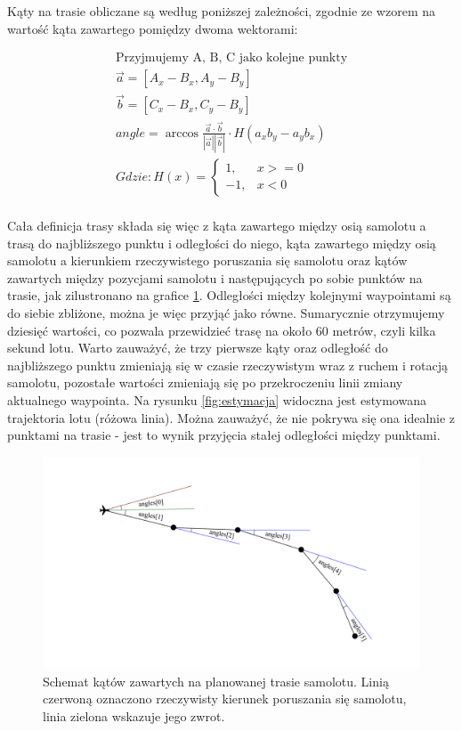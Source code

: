 \documentclass[12pt, a4paper]{article}
\begin{document}
Kąty na trasie obliczane są według poniższej zależności, zgodnie ze wzorem na wartość kąta zawartego pomiędzy dwoma wektorami:

\begin{gather*} 
	\text{Przyjmujemy A, B, C jako kolejne punkty} \\ 
 	\vec{a} = [A_x - B_x, A_y - B_y] \\
 	\vec{b} = [C_x - B_x, C_y - B_y] \\
 	angle = 	\arccos{\frac{\vec{a} \cdot \vec{b}}{|\vec{a}||\vec{b}|} } \cdot H(a_x b_y -  a_y b_x) \\ 
 	Gdzie:
 	H(x) = \begin{cases} 1, & x >= 0 \\ -1, & x < 0 \end{cases}\\
\end{gather*}

Cała definicja trasy składa się więc z kąta zawartego między osią samolotu a trasą do najbliższego punktu i odległości do niego, kąta zawartego między osią samolotu a kierunkiem rzeczywistego poruszania się samolotu oraz kątów zawartych między pozycjami samolotu i następujących po sobie punktów na trasie, jak zilustronano na grafice \ref{fig:katy}. Odległości między kolejnymi waypointami są do siebie zbliżone, można je więc przyjąć jako równe. Sumarycznie otrzymujemy dziesięć wartości, co pozwala przewidzieć trasę na około 60 metrów, czyli kilka sekund lotu. Warto zauważyć, że trzy pierwsze kąty oraz odległość do najbliższego punktu zmieniają się w czasie rzeczywistym wraz z ruchem i rotacją samolotu, pozostałe wartości zmieniają się po przekroczeniu linii zmiany aktualnego waypointa. Na rysunku \ref{fig:estymacja} widoczna jest estymowana trajektoria lotu (różowa linia). Można zauważyć, że nie pokrywa się ona idealnie z punktami na trasie - jest to wynik przyjęcia stałej odległości między punktami.

 \begin{figure}[ht]
    \centering
    \includegraphics[width=1\textwidth]{angles}
    \caption{Schemat kątów zawartych na planowanej trasie samolotu. Linią czerwoną oznaczono rzeczywisty kierunek poruszania się samolotu, linia zielona wskazuje jego zwrot.}
    \label{fig:katy}
\end{figure}
\end{document}
